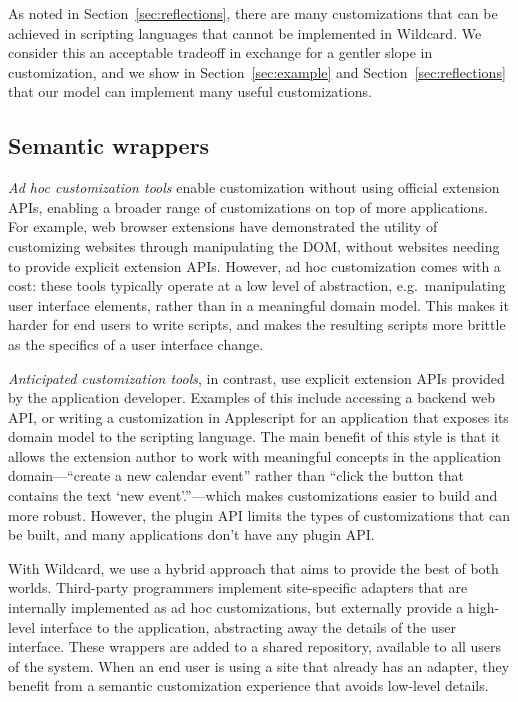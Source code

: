 \documentclass[sigplan,screen,10pt,anonymous,review]{acmart}
\begin{document}
As noted in Section~\ref{sec:reflections}, there are many customizations
that can be achieved in scripting languages that cannot be implemented
in Wildcard. We consider this an acceptable tradeoff in exchange for a
gentler slope in customization, and we show in Section~\ref{sec:example}
and Section~\ref{sec:reflections} that our model can implement many
useful customizations.

\hypertarget{semantic-wrappers}{%
\subsection{Semantic wrappers}\label{semantic-wrappers}}

\emph{Ad hoc customization tools} enable customization without using
official extension APIs, enabling a broader range of customizations on
top of more applications. For example, web browser extensions have
demonstrated the utility of customizing websites through manipulating
the DOM, without websites needing to provide explicit extension APIs.
However, ad hoc customization comes with a cost: these tools typically
operate at a low level of abstraction, e.g.~manipulating user interface
elements, rather than in a meaningful domain model. This makes it harder
for end users to write scripts, and makes the resulting scripts more
brittle as the specifics of a user interface change.

\emph{Anticipated customization tools}, in contrast, use explicit
extension APIs provided by the application developer. Examples of this
include accessing a backend web API, or writing a customization in
Applescript for an application that exposes its domain model to the
scripting language. The main benefit of this style is that it allows the
extension author to work with meaningful concepts in the application
domain---``create a new calendar event'' rather than ``click the button
that contains the text `new event'.''---which makes customizations
easier to build and more robust. However, the plugin API limits the
types of customizations that can be built, and many applications don't
have any plugin API.

With Wildcard, we use a hybrid approach that aims to provide the best of
both worlds. Third-party programmers implement site-specific adapters
that are internally implemented as ad hoc customizations, but externally
provide a high-level interface to the application, abstracting away the
details of the user interface. These wrappers are added to a shared
repository, available to all users of the system. When an end user is
using a site that already has an adapter, they benefit from a semantic
customization experience that avoids low-level details.
\end{document}
